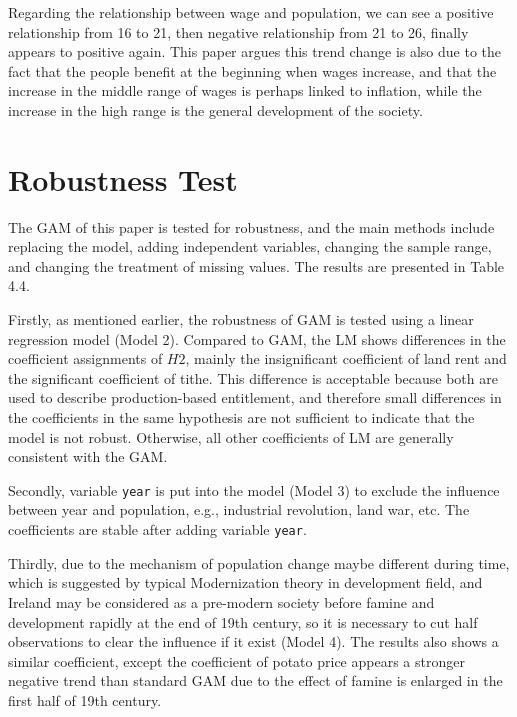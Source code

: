 Regarding the relationship between wage and population, we can see a positive relationship from 16 to 21, then negative relationship from 21 to 26, finally appears to positive again. This paper argues this trend change is also due to the fact that the people benefit at the beginning when wages increase, and that the increase in the middle range of wages is perhaps linked to inflation, while the increase in the high range is the general development of the society.

\newpage

\section{Robustness Test}

The GAM of this paper is tested for robustness, and the main methods include replacing the model, adding independent variables, changing the sample range, and changing the treatment of missing values. The results are presented in Table 4.4.

Firstly, as mentioned earlier, the robustness of GAM is tested using a linear regression model (Model 2). Compared to GAM, the LM shows differences in the coefficient assignments of $H2$, mainly the insignificant coefficient of land rent and the significant coefficient of tithe. This difference is acceptable because both are used to describe production-based entitlement, and therefore small differences in the coefficients in the same hypothesis are not sufficient to indicate that the model is not robust. Otherwise, all other coefficients of LM are generally consistent with the GAM.

Secondly, variable \texttt{year} is put into the model (Model 3) to exclude the influence between year and population, e.g., industrial revolution, land war, etc. The coefficients are stable after adding variable \texttt{year}.

Thirdly, due to the mechanism of population change maybe different during time, which is suggested by typical Modernization theory \citep{tipps1973modernization} in development field, and Ireland may be considered as a pre-modern society before famine and development rapidly at the end of 19th century, so it is necessary to cut half observations to clear the influence if it exist (Model 4). The results also shows a similar coefficient, except the coefficient of potato price appears a stronger negative trend than standard GAM due to the effect of famine is enlarged in the first half of 19th century.

